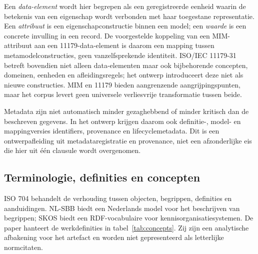 Een \emph{data-element} wordt hier begrepen als een geregistreerde eenheid waarin de betekenis van een eigenschap wordt verbonden met haar toegestane representatie. Een \emph{attribuut} is een eigenschapconstructie binnen een model; een \emph{waarde} is een concrete invulling in een record. De voorgestelde koppeling van een MIM-attribuut aan een 11179-data-element is daarom een mapping tussen metamodelconstructies, geen vanzelfsprekende identiteit. ISO/IEC 11179-31 betreft bovendien niet alleen data-elementen maar ook bijbehorende concepten, domeinen, eenheden en afleidingsregels; het ontwerp introduceert deze niet als nieuwe constructies. MIM en 11179 bieden aangrenzende aangrijpingspunten, maar het corpus levert geen universele verliesvrije transformatie tussen beide. \citep{S13,S08}

Metadata zijn niet automatisch minder gezaghebbend of minder kritisch dan de beschreven gegevens. In het ontwerp krijgen daarom ook definitie-, model- en mappingversies identifiers, provenance en lifecyclemetadata. Dit is een ontwerpafleiding uit metadata\-registratie en provenance, niet een afzonderlijke eis die hier uit één clausule wordt overgenomen. \citep{S07,S10,S33}

\subsection{Terminologie, definities en concepten}
ISO 704 behandelt de verhouding tussen objecten, begrippen, definities en aanduidingen. NL-SBB biedt een Nederlands model voor het beschrijven van begrippen; SKOS biedt een RDF-vocabulaire voor kennisorganisatiesystemen. \citep{S11,S14,S31} De paper hanteert de werkdefinities in tabel~\ref{tab:concepts}. Zij zijn een analytische afbakening voor het artefact en worden niet gepresenteerd als letterlijke normcitaten.

